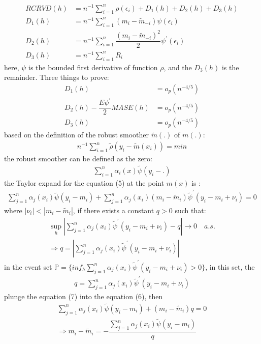 \documentclass[12pt]{amsart}
\begin{document}
\begin{align}
RCRVD(h)&=n^{-1}\sum^{n}_{i=1}\rho(\epsilon_{i})+D_{1}(h)+D_{2}(h)+D_{3}(h)\nonumber\\
D_{1}(h)&=n^{-1}\sum^{n}_{i=1}(m_{i}-\widetilde{m}_{-i})\psi(\epsilon_{i})\nonumber\\
D_{2}(h)&=n^{-1}\sum^{n}_{i=1}\dfrac{(m_{i}-\widetilde{m}_{-i})^{2}}{2}\psi^{'}(\epsilon_{i})\nonumber\\
D_{3}(h)&=n^{-1}\sum^{n}_{i=1}R_{i}\nonumber
\end{align}
here, $\psi$ is the bounded first derivative of function $\rho$, and the $D_{3}(h)$ is the remainder. Three things to prove:
\begin{align}
D_{1}(h)&=o_{p}(n^{-4/5})\\
D_{2}(h)-\dfrac{E\psi^{'}}{2}MASE(h)&=o_{p}(n^{-4/5})\\
D_{3}(h)&=o_{p}(n^{-4/5})
\end{align}
based on the definition of the robust smoother $\widetilde{m}(.)$ of $m(.)$:
\begin{align}
n^{-1}\sum_{i=1}^{n}\widetilde{\rho}(y_{i}-\widetilde{m}(x_{i}))=min \nonumber
\end{align}
the robust smoother can be defined as the zero:
\begin{align}
\sum_{i=1}^{n}\alpha_{i}(x)\widetilde{\psi}(y_{i}-.)
\end{align}
the Taylor expand for the equation (5) at the point $m(x)$ is :
\begin{align}
\sum_{j=1}^{n}\alpha_{j}(x_{i})\widetilde{\psi}(y_{i}-m_{i})+\sum_{j=1}^{n}\alpha_{j}(x_{i})(m_{i}-\widetilde{m}_{i})\widetilde{\psi}^{'}(y_{i}-m_{i}+\nu_{i})=0
\end{align}
where $|\nu_{i}|<|m_{i}-\widetilde{m}_{i}|$, if there exists a constant $q>0$ such that:
\begin{align}
\sup_{h}|\sum_{j=1}^{n}\alpha_{j}(x_{i})\widetilde{\psi}^{'}(y_{i}-m_{i}+\nu_{i})-q|\rightarrow 0   \quad a.s.\nonumber\\
\Rightarrow q=|\sum_{j=1}^{n}\alpha_{j}(x_{i})\widetilde{\psi}^{'}(y_{i}-m_{i}+\nu_{i})|\nonumber
\end{align}
in the event set $\mathbb{P}=\{inf_{h}\sum_{j=1}^{n}\alpha_{j}(x_{i})\widetilde{\psi}^{'}(y_{i}-m_{i}+\nu_{i})>0\}$, in this set, the 
\begin{align}
q=\sum_{j=1}^{n}\alpha_{j}(x_{i})\widetilde{\psi}^{'}(y_{i}-m_{i}+\nu_{i})
\end{align}
plunge the equation (7) into the equation (6), then 
\begin{align}
\sum_{j=1}^{n}\alpha_{j}(x_{i})\widetilde{\psi}(y_{i}-m_{i})+(m_{i}-\widetilde{m}_{i})q=0\nonumber\\
\Rightarrow m_{i}-\widetilde{m}_{i}=-\dfrac{\sum_{j=1}^{n}\alpha_{j}(x_{i})\widetilde{\psi}(y_{i}-m_{i})}{q}\nonumber
\end{align}
\end{document}
